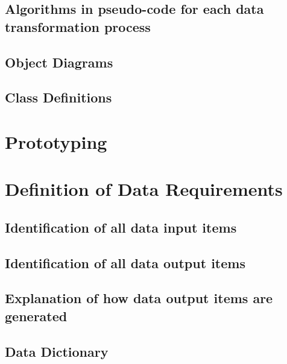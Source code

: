 \subsection{Algorithms in pseudo-code for each data transformation process}

\subsection{Object Diagrams}

\subsection{Class Definitions}

\section{Prototyping}

\section{Definition of Data Requirements}

\subsection{Identification of all data input items}

\subsection{Identification of all data output items}

\subsection{Explanation of how data output items are generated}

\subsection{Data Dictionary}

